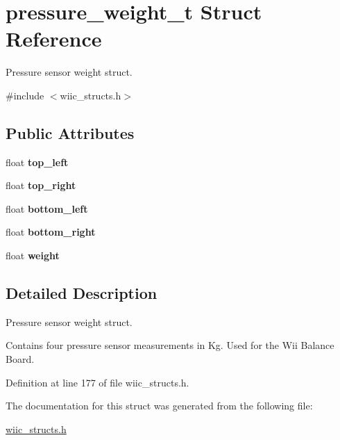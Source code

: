 \hypertarget{structpressure__weight__t}{\section{pressure\-\_\-weight\-\_\-t Struct Reference}
\label{structpressure__weight__t}
}


Pressure sensor weight struct.  




{\ttfamily \#include $<$wiic\-\_\-structs.\-h$>$}

\subsection*{Public Attributes}
\begin{DoxyCompactItemize}
\item 
\hypertarget{structpressure__weight__t_a4603611d0fdb9b80e4465f798f78a24d}{float {\bfseries top\-\_\-left}}\label{structpressure__weight__t_a4603611d0fdb9b80e4465f798f78a24d}

\item 
\hypertarget{structpressure__weight__t_a9821f4d6ef40b6a796d9dd58f95cc987}{float {\bfseries top\-\_\-right}}\label{structpressure__weight__t_a9821f4d6ef40b6a796d9dd58f95cc987}

\item 
\hypertarget{structpressure__weight__t_aadd0292e24dfbfed6d62050447d7496d}{float {\bfseries bottom\-\_\-left}}\label{structpressure__weight__t_aadd0292e24dfbfed6d62050447d7496d}

\item 
\hypertarget{structpressure__weight__t_a50f211934ff8139f85ba41c71834be9a}{float {\bfseries bottom\-\_\-right}}\label{structpressure__weight__t_a50f211934ff8139f85ba41c71834be9a}

\item 
\hypertarget{structpressure__weight__t_ab35b28c2c97cff296b9e94d327dd2097}{float {\bfseries weight}}\label{structpressure__weight__t_ab35b28c2c97cff296b9e94d327dd2097}

\end{DoxyCompactItemize}


\subsection{Detailed Description}
Pressure sensor weight struct. 

Contains four pressure sensor measurements in Kg. Used for the Wii Balance Board. 

Definition at line 177 of file wiic\-\_\-structs.\-h.



The documentation for this struct was generated from the following file\-:\begin{DoxyCompactItemize}
\item 
\hyperlink{wiic__structs_8h}{wiic\-\_\-structs.\-h}\end{DoxyCompactItemize}
